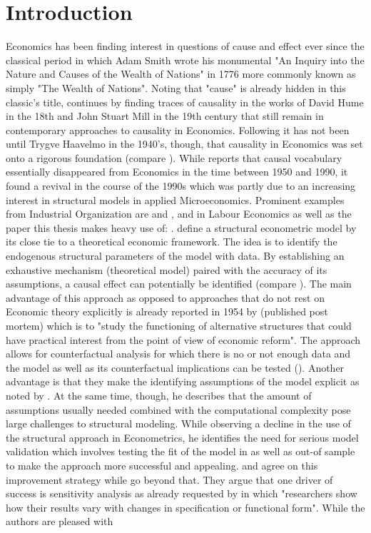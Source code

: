 \section{Introduction}
\thispagestyle{plain} %

Economics has been finding interest in questions of cause and effect ever since the classical period in which Adam Smith wrote his monumental "An Inquiry into the Nature and Causes of the Wealth of Nations" in 1776 more commonly known as simply "The Wealth of Nations". Noting that "cause" is already hidden in this classic's title, \cite{Hoover.2008} continues by finding traces of causality in the works of David Hume in the 18th and John Stuart Mill in the 19th century that still remain in contemporary approaches to causality in Economics. Following \cite{Heckman.2013} it has not been until Trygve Haavelmo in the 1940's, though, that causality in Economics was set onto a rigorous foundation (compare \cite{Haavelmo.1943, Haavelmo.1944}). While \cite{Hoover.2008} reports that causal vocabulary essentially disappeared from Economics in the time between 1950 and 1990, it found a revival in the course of the 1990s which was partly due to an increasing interest in structural models in applied Microeconomics. Prominent examples from Industrial Organization are \cite{Berry.1995} and \cite{Goldberg.1995}, \cite{Keane.1994} and \cite{Keane.1997} in Labour Economics as well as the paper this thesis makes heavy use of: \cite{Rust.1987}. \cite{Low.2017} define a structural econometric model by its close tie to a theoretical economic framework. The idea is to identify the endogenous structural parameters of the model with data. By establishing an exhaustive mechanism (theoretical model) paired with the accuracy of its assumptions, a causal effect can potentially be identified (compare \cite{Morgan.2015}). The main advantage of this approach as opposed to approaches that do not rest on Economic theory explicitly is already reported in 1954 by \cite{Haavelmo.2015} (published post mortem) which is to "study the functioning of alternative structures that could have practical interest from the point of view of economic reform". The approach allows for counterfactual analysis for which there is no or not enough data and the model as well as its counterfactual implications can be tested (\cite{Low.2017}). Another advantage is that they make the identifying assumptions of the model explicit as noted by \cite{Keane.2010}. At the same time, though, he describes that the amount of assumptions usually needed combined with the computational complexity pose large challenges to structural modeling. While observing a decline in the use of the structural approach in Econometrics, he identifies the need for serious model validation which involves testing the fit of the model in as well as out-of sample to make the approach more successful and appealing. \cite{Rust.2014} and \cite{Wolpin.2013} agree on this improvement strategy while \cite{Angrist.2010} go beyond that. They argue that one driver of success is sensitivity analysis as already requested by \cite{Leamer.1983} in which "researchers show how their results vary with changes in specification or functional form". While the authors are pleased with 